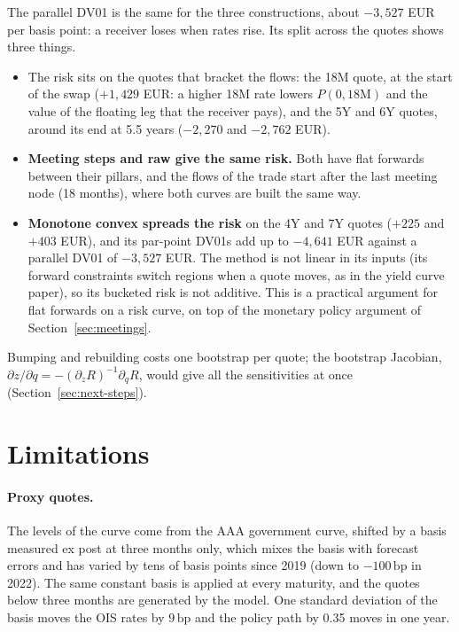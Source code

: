 \documentclass[11pt,a4paper]{article}
\theoremstyle{plain}
\theoremstyle{definition}
\newcommand{\bp}{\,\mathrm{bp}}
\begin{document}
The parallel DV01 is the same for the three constructions, about $-3{,}527$ EUR per basis point: a receiver loses when rates rise. Its split across the quotes shows three things.
\begin{itemize}
    \item The risk sits on the quotes that bracket the flows: the 18M quote, at the start of the swap ($+1{,}429$ EUR: a higher 18M rate lowers $P(0,18\mathrm{M})$ and the value of the floating leg that the receiver pays), and the 5Y and 6Y quotes, around its end at 5.5 years ($-2{,}270$ and $-2{,}762$ EUR).
    \item \textbf{Meeting steps and raw give the same risk.} Both have flat forwards between their pillars, and the flows of the trade start after the last meeting node (18 months), where both curves are built the same way.
    \item \textbf{Monotone convex spreads the risk} on the 4Y and 7Y quotes ($+225$ and $+403$ EUR), and its par-point DV01s add up to $-4{,}641$ EUR against a parallel DV01 of $-3{,}527$ EUR. The method is not linear in its inputs (its forward constraints switch regions when a quote moves, as in the yield curve paper), so its bucketed risk is not additive. This is a practical argument for flat forwards on a risk curve, on top of the monetary policy argument of Section~\ref{sec:meetings}.
\end{itemize}
Bumping and rebuilding costs one bootstrap per quote; the bootstrap Jacobian, $\partial z/\partial q=-(\partial_zR)^{-1}\partial_qR$, would give all the sensitivities at once (Section~\ref{sec:next-steps}).

\clearpage
\section{Limitations}
\label{sec:limits}

\paragraph{Proxy quotes.} The levels of the curve come from the AAA government curve, shifted by a basis measured ex post at three months only, which mixes the basis with forecast errors and has varied by tens of basis points since 2019 (down to $-100\bp$ in 2022). The same constant basis is applied at every maturity, and the quotes below three months are generated by the model. One standard deviation of the basis moves the OIS rates by $9\bp$ and the policy path by 0.35 moves in one year.
\end{document}
